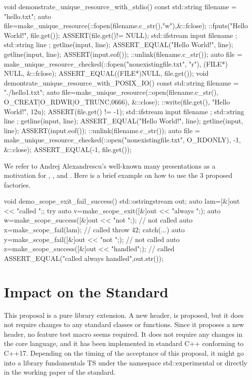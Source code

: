 \documentclass[ebook,11pt,article]{memoir}
\begin{document}
\begin{codeblock}
void demonstrate_unique_resource_with_stdio() {
  const std::string filename = "hello.txt";
  { auto file=make_unique_resource(::fopen(filename.c_str(),"w"),&::fclose);
    ::fputs("Hello World!\n", file.get());
    ASSERT(file.get()!= NULL);
  }
  { std::ifstream input { filename };
    std::string line { };
    getline(input, line);
    ASSERT_EQUAL("Hello World!", line);
    getline(input, line);
    ASSERT(input.eof());
  }
  ::unlink(filename.c_str());
  {
    auto file = make_unique_resource_checked(::fopen("nonexistingfile.txt", "r"), 
                (FILE*) NULL, &::fclose);
    ASSERT_EQUAL((FILE*)NULL, file.get());
  }
}
void demontrate_unique_resource_with_POSIX_IO() {
  const std::string filename = "./hello1.txt";
  { auto file=make_unique_resource(::open(filename.c_str(),
                     O_CREAT|O_RDWR|O_TRUNC,0666), &::close);
    ::write(file.get(), "Hello World!\n", 12u);
    ASSERT(file.get() != -1);
  }
  { std::ifstream input { filename };
    std::string line { };
    getline(input, line);
    ASSERT_EQUAL("Hello World!", line);
    getline(input, line);
    ASSERT(input.eof());
  }
  ::unlink(filename.c_str());
  {
    auto file = make_unique_resource_checked(::open("nonexistingfile.txt", 
                       O_RDONLY), -1, &::close);
    ASSERT_EQUAL(-1, file.get());
  }
}\end{codeblock}

We refer to Andrej Alexandrescu's well-known many presentations as a motivation for , , and . Here is a brief example on how to use the 3 proposed factories. 
\begin{codeblock}
void demo_scope_exit_fail_success(){
  std::ostringstream out{};
  auto lam=[&]{out << "called ";};
  try{
    auto v=make_scope_exit([&]{out << "always ";});
    auto w=make_scope_success([&]{out << "not ";}); // not called
    auto x=make_scope_fail(lam); // called
    throw 42;
  }catch(...){
    auto y=make_scope_fail([&]{out << "not ";}); // not called
    auto z=make_scope_success([&]{out << "handled";}); // called
  }
  ASSERT_EQUAL("called always handled",out.str());
}
\end{codeblock}


\chapter{Impact on the Standard}
This proposal is a pure library extension. A new header,  is proposed, but it does not require changes to any standard classes or functions. Since it proposes a new header, no feature test macro seems required. It does not require any changes in the core language, and it has been implemented in standard C++ conforming to  C++17. Depending on the timing of the acceptance of this proposal, it might go into a library fundamentals TS under the namespace std::experimental or directly in the working paper of the standard.
\end{document}
